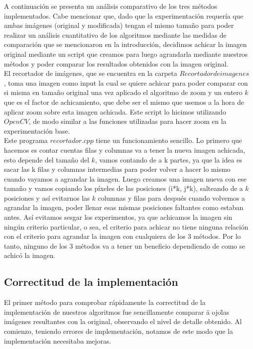 A continuación se presenta un análisis comparativo de los tres métodos implementados.
Cabe mencionar que, dado que la experimentación requería que ambas imágenes (original y modificada) tengan el mismo tamaño para poder realizar un análisis cuantitativo de los algoritmos mediante las medidas de comparación que se mencionaron en la introducción, decidimos achicar la imagen original mediante un script que creamos para luego agrandarla mediante nuestros métodos y poder comparar los resultados obtenidos con la imagen original.
\\
El recortador de imágenes, que se encuentra en la carpeta $Recortador de imagenes$, toma una imagen como input la cual se quiere achicar para poder comparar con si misma en tamaño original una vez aplicado el algoritmo de zoom y un entero $k$ que es el factor de achicamiento, que debe ser el mismo que usemos a la hora de aplicar zoom sobre esta imagen achicada. Este script lo hicimos utilizando $OpenCV$, de modo similar a las funciones utilizadas para hacer zoom en la experimentación base.
\\ 
Este programa $recortador.cpp$ tiene un funcionamiento sencillo.
Lo primero que hacemos es contar cuentas filas y columnas va a tener la nueva imagen achicada, esto depende del tamaño del $k$, vamos contando de a k partes, ya que la idea es sacar las k filas y columnas intermedias para poder volver a hacer lo mismo cuando vayamos a agrandar la imagen. Luego creamos una imagen nueva con ese tamaño y vamos copiando los píxeles de las posiciones (i*k, j*k), salteando de a $k$ posiciones y así evitarnos las $k$ columnas y filas para después cuando volvemos a agrandar la imagen, poder llenar esas mismas posiciones faltantes como estaban antes. Así evitamos sesgar los experimentos, ya que achicamos la imagen sin ningún criterio particular, o sea, el criterio para achicar no tiene ninguna relación con el criterio para agrandar la imagen con cualquiera de los 3 métodos. Por lo tanto, ninguno de los 3 métodos va a tener un beneficio dependiendo de como se achicó la imagen.   

\subsection{Correctitud de la implementación}

El primer método para comprobar rápidamente la correctitud de la implementación de nuestros algoritmos fue sencillamente comparar \"a ojo\" las imágenes resultantes con la original, observando el nivel de detalle obtenido. Al comienzo, teniendo errores de implementación, notamos de este modo que la implementación necesitaba mejoras.

